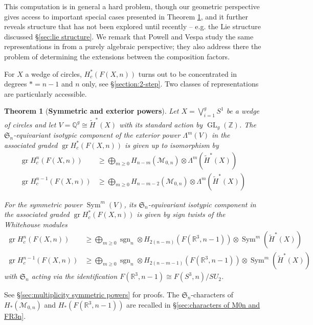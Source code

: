 \documentclass[12pt]{article}
\newcommand{\Z}{\mathbb{Z}}
\newcommand{\Q}{\mathbb{Q}}
\newcommand{\R}{\mathbb{R}}
\newcommand{\SymGroup}[1][n]{\mathfrak{S}_{#1}}
\newcommand{\ModuliCurve}[1]{\mathcal{M}_{#1}}
\newcommand{\sgn}[1][n]{\operatorname{sgn}_{#1}}
\DeclareMathOperator{\GL}{GL}
\DeclareMathOperator{\gr}{gr}
\DeclareMathOperator{\Out}{Out}
\DeclareMathOperator{\Sym}{Sym}
\theoremstyle{plain}
\newtheorem{thm}{Theorem}[section]
\theoremstyle{definition}
\theoremstyle{remark}
\begin{document}
This computation is in general a hard problem, though our geometric perspective gives access to important special cases presented in Theorem \ref{thm:symmetric and alternating powers}, and it further reveals structure that has not been explored until recently -- e.g. the Lie structure discussed \S\ref{sec:lie structure}. We remark that Powell and Vespa study the same representations in \cite{PV18} from a purely algebraic perspective; they also address there the problem of determining the extensions between the composition factors.


For $X$ a wedge of circles, $H_c^*(F(X, n))$ turns out to be concentrated in degrees $* = n-1$ and $n$ only, see \S\ref{section:2-step}. Two classes of representations are particularly accessible.
\begin{thm}[\textbf{Symmetric and exterior powers}]\label{thm:symmetric and alternating powers}
    Let $X = \bigvee^g_{i=1} S^1$ be a wedge of circles and let $V = \Q^g \cong \tilde{H}^{\ast}(X)$ with its standard action by $\GL_g(\Z)$. The $\SymGroup$-equivariant isotypic component of the exterior power $\Lambda^m(V)$ in the associated graded $\gr H_c^*(F(X, n))$ is given up to isomorphism by
\begin{align}
    \gr H^n_c(F(X,n)) &\geq \bigoplus_{m\geq 0} H_{n-m}(\ModuliCurve{0,n}) \otimes \Lambda^m(\tilde{H}^*(X)) \\
    \gr H^{n-1}_c(F(X,n)) &\geq \bigoplus_{m\geq 0} H_{n-m-2}(\ModuliCurve{0,n}) \otimes \Lambda^m(\tilde{H}^*(X))
\end{align}
    
    For the symmetric power $\Sym^m(V)$, its $\SymGroup$-equivariant isotypic component in the associated graded $\gr H_c^*(F(X, n))$ is given by sign twists of the Whitehouse modules
    \begin{align}
    \gr H^n_c(F(X,n)) &\geq \bigoplus_{m\geq 0} \sgn\otimes H_{2(n-m)}(F(\R^3,n-1)) \otimes \Sym^m(\tilde{H}^*(X)) \\
    \gr H^{n-1}_c(F(X,n)) &\geq \bigoplus_{m\geq 0} \sgn\otimes H_{2(n-m-1)}(F(\R^3,n-1)) \otimes \Sym^m(\tilde{H}^*(X)) 
\end{align}
    with $\SymGroup$ acting via the identification $F(\mathbb{R}^3,n-1) \cong F(S^3,n)/SU_2$.
\end{thm}
See \S\ref{sec:multiplicity symmetric powers} for proofs. The $\SymGroup$-characters of $H_*(\ModuliCurve{0,n})$ and $H_*(F(\R^3,n-1))$ are recalled in \S\ref{sec:characters of M0n and FR3n}.
\end{document}
